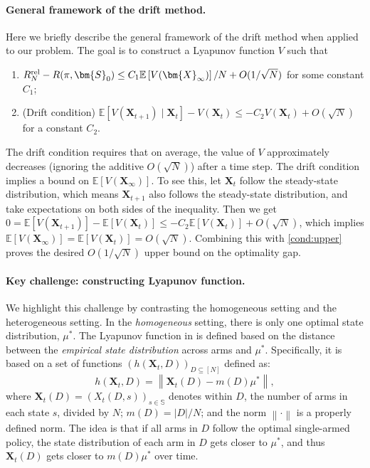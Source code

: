 \documentclass{article}
\theoremstyle{plain}
\theoremstyle{remark}
\newcommand{\norm}[1]{\left\lVert#1\right\rVert}
\newcommand{\E}[1]{\mathbb{E}\left[#1\right]}
\newcommand{\sspa}{\mathbb{S}}
\newcommand{\rel}{\textup{rel}} %
\def\mX{{\bm{X}}}
\newcommand{\EE}{\mathbb{E}}
\newcommand{\mbracket}[1]{\left[#1\right]}
\begin{document}
\paragraph{General framework of the drift method.}
Here we briefly describe the general framework of the drift method when applied to our problem.
The goal is to construct a Lyapunov function $V$ such that
\begin{enumerate}[label=(\textbf{C\arabic*}),leftmargin=4em]
    \item\label{cond:upper} $R_N^{\rel}-R(\pi,\bm{S}_0) \le C_1\E{V(\mX_{\infty})}/N+O(1/\sqrt{N})$ for some constant $C_1$;
    \item\label{cond:drift} (Drift condition) $\EE\mbracket{V(\mX_{t+1})\mid \mX_t}-V(\mX_t)\leq -C_2V(\mX_t)+ O(\sqrt{N})$ for a constant $C_2$.
\end{enumerate}
The drift condition requires that on average, the value of $V$ approximately decreases (ignoring the additive $O(\sqrt{N})$) after a time step.
The drift condition implies a bound on $\E{V(\mX_{\infty})}$.
To see this, let $\mX_t$ follow the steady-state distribution, which means $\mX_{t+1}$ also follows the steady-state distribution, and take expectations on both sides of the inequality.
Then we get $0=\EE\mbracket{V(\mX_{t+1})}-\E{V(\mX_t)}\leq -C_2\E{V(\mX_t)}+ O(\sqrt{N})$, which implies $\E{V(\mX_{\infty})}=\E{V(\mX_t)}=O(\sqrt{N}).$
Combining this with \ref{cond:upper} proves the desired $O(1/\sqrt{N})$ upper bound on the optimality gap.

\paragraph{Key challenge: constructing Lyapunov function.}
We highlight this challenge by contrasting the homogeneous setting and the heterogeneous setting.
In the \emph{homogeneous} setting, there is only one optimal state distribution, $\mu^*$.
The Lyapunov function in \citep{HonXieChe_24} is defined based on the distance between the \emph{empirical state distribution} across arms and $\mu^*$.  Specifically, it is based on a set of functions $(h(\mX_t,D))_{D\subseteq [N]}$ defined as:
\begin{equation}
    h(\mX_t,D)=\norm{\mX_t(D)-m(D)\mu^*},
\end{equation}
where $\mX_t(D)=(X_t(D,s))_{s\in\sspa}$ denotes within $D$, the number of arms in each state $s$, divided by $N$; $m(D)=|D|/N$; and the norm $\norm{\cdot}$ is a properly defined norm.
The idea is that if all arms in $D$ follow the optimal single-armed policy, the state distribution of each arm in $D$ gets closer to $\mu^*$, and thus $\mX_t(D)$ gets closer to $m(D)\mu^*$ over time. 
\end{document}
